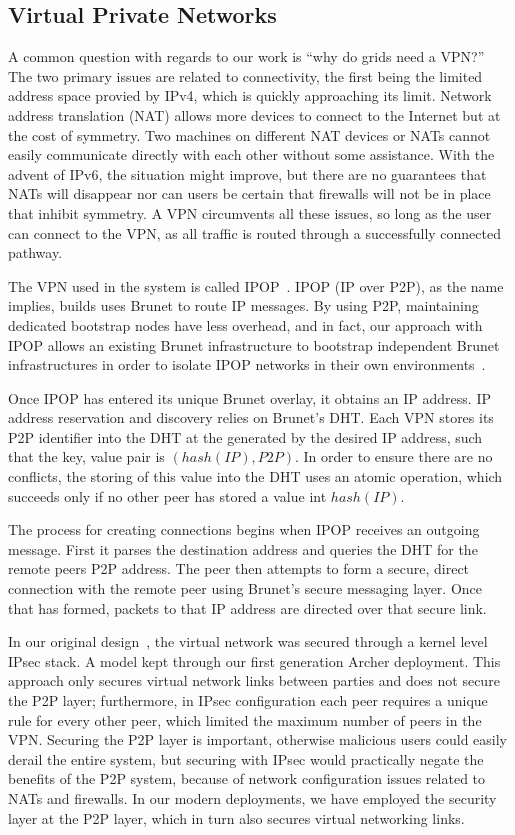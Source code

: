 \documentclass[conference]{IEEEtran}
\begin{document}
\subsection{Virtual Private Networks}

A common question with regards to our work is ``why do grids need a VPN?'' The
two primary issues are related to connectivity, the first being the limited
address space provied by IPv4, which is quickly approaching its limit.  Network
address translation (NAT) allows more devices to connect to the Internet but at
the cost of symmetry.  Two machines on different NAT devices or NATs cannot
easily communicate directly with each other without some assistance.  With the
advent of IPv6, the situation might improve, but there are no guarantees that
NATs will disappear nor can users be certain that firewalls will not be in
place that inhibit symmetry.  A VPN circumvents all these issues, so long as
the user can connect to the VPN, as all traffic is routed through a
successfully connected pathway.

The VPN used in the system is called IPOP~\cite{groupvpn, ipop}.  IPOP (IP over
P2P), as the name implies, builds uses Brunet to route IP messages.  By using
P2P, maintaining dedicated bootstrap nodes have less overhead, and in fact, our
approach with IPOP allows an existing Brunet infrastructure to bootstrap
independent Brunet infrastructures in order to isolate IPOP networks in their
own environments~\cite{bootstrapping}.

Once IPOP has entered its unique Brunet overlay, it obtains an IP address.  IP
address reservation and discovery relies on Brunet's DHT.  Each VPN stores its
P2P identifier into the DHT at the generated by the desired IP address, such
that the key, value pair is $(hash(IP), P2P)$.  In order to ensure there are no
conflicts, the storing of this value into the DHT uses an atomic operation,
which succeeds only if no other peer has stored a value int $hash(IP)$.

The process for creating connections begins when IPOP receives an outgoing
message.  First it parses the destination address and queries the DHT for the
remote peers P2P address.  The peer then attempts to form a secure, direct
connection with the remote peer using Brunet's secure messaging layer.  Once
that has formed, packets to that IP address are directed over that secure link.

In our original design~\cite{vtdc}, the virtual network was secured through a
kernel level IPsec stack.  A model kept through our first generation Archer
deployment.  This approach only secures virtual network links between parties
and does not secure the P2P layer; furthermore, in IPsec configuration each
peer requires a unique rule for every other peer, which limited the maximum
number of peers in the VPN.  Securing the P2P layer is important, otherwise
malicious users could easily derail the entire system, but securing with IPsec
would practically negate the benefits of the P2P system, because of network
configuration issues related to NATs and firewalls.  In our modern deployments,
we have employed the security layer at the P2P layer, which in turn also
secures virtual networking links.
\end{document}
